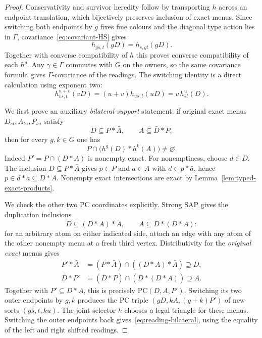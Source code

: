 \begin{proof}
Conservativity and survivor heredity follow by transporting
$h$ across an endpoint translation, which bijectively preserves
inclusion of exact menus.  Since switching both endpoints by
$g$ fixes fine colours and the diagonal type action lies in
$\Gamma$, covariance~\eqref{eq:covariant-HS} gives
\[
 h_{gs,t}(gD)=h_{s,gt}(gD).
\]
Together with converse compatibility of $h$ this proves
converse compatibility of each $h^g$.  Any $\gamma\in\Gamma$
commutes with $G$ on the owners, so the same covariance formula
gives $\Gamma$-covariance of the readings.  The switching
identity is a direct calculation using exponent two:
\[
 h^{u+v}_{vs,t}(vD)
 =(u+v)h_{us,t}(uD)=v\,h^u_{st}(D).
\]

We first prove an auxiliary \emph{bilateral-support} statement:
if original exact menus $D_{st},A_{tu},P_{su}$ satisfy
\[
 D\subseteq P*\bar A,\qquad A\subseteq\bar D*P,
\]
then for every $g,k\in G$ one has
\begin{equation}\label{eq:reading-bilateral}
 P\cap\bigl(h^g(D)*h^k(A)\bigr)\ne\varnothing.
\end{equation}
Indeed $P'=P\cap(D*A)$ is nonempty exact.  For nonemptiness,
choose $d\in D$.  The inclusion $D\subseteq P*\bar A$ gives
$p\in P$ and $a\in A$ with $d\in p*\bar a$, hence
$p\in d*a\subseteq D*A$.  Nonempty exact intersections are exact
by Lemma~\ref{lem:typed-exact-products}.

We check the other two PC coordinates explicitly.  Strong SAP gives
the duplication inclusions
\[
 D\subseteq(D*A)*\bar A,\qquad
 A\subseteq\bar D*(D*A):
\]
for an arbitrary atom on either indicated side, attach an edge
with any atom of the other nonempty menu at a fresh third vertex.
Distributivity for the \emph{original exact} menus gives
\[
\begin{aligned}
 P'*\bar A
  &=(P*\bar A)\cap((D*A)*\bar A)\supseteq D,\\
 \bar D*P'
  &=(\bar D*P)\cap(\bar D*(D*A))\supseteq A.
\end{aligned}
\]
Together with $P'\subseteq D*A$, this is precisely
$\mathrm{PC}(D,A,P')$.  Switching its two outer endpoints by $g,k$
produces the PC triple
$(gD,kA,(g+k)P')$ of new sorts $(gs,t,ku)$.
The joint selector $h$ chooses a legal triangle for these menus.
Switching the outer endpoints back gives~\eqref{eq:reading-bilateral},
using the equality of the left and right shifted readings.


\end{proof}
